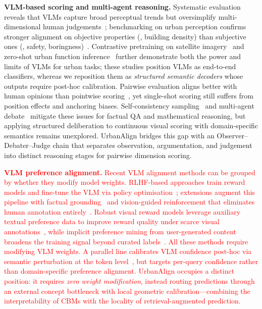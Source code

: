 \documentclass[runningheads]{llncs}
\begin{document}
\smallskip\noindent\textbf{VLM-based scoring and multi-agent reasoning.}
Systematic evaluation reveals that VLMs capture broad perceptual trends but oversimplify multi-dimensional human judgements~\cite{zhang2025genai}; benchmarking on urban perception confirms stronger alignment on objective properties (\eg, building density) than subjective ones (\eg, safety, boringness)~\cite{mushkani2025dovlms}.
Contrastive pretraining on satellite imagery~\cite{yan2024urbanclip} and zero-shot urban function inference~\cite{huang2024zeroshot} further demonstrate both the power and limits of VLMs for urban tasks; these studies position VLMs as end-to-end classifiers, whereas we reposition them as \emph{structured semantic decoders} whose outputs require post-hoc calibration.
Pairwise evaluation aligns better with human opinions than pointwise scoring~\cite{wu2024qalign,liu2024pairs}, yet single-shot scoring still suffers from position effects and anchoring biases.
Self-consistency sampling~\cite{wang2023selfconsistency} and multi-agent debate~\cite{du2024improving,liang2024encouraging,liu2025dmad} mitigate these issues for factual QA and mathematical reasoning, but applying structured deliberation to continuous visual scoring with domain-specific semantics remains unexplored.
UrbanAlign bridges this gap with an Observer--Debater--Judge chain that separates observation, argumentation, and judgement into distinct reasoning stages for pairwise dimension scoring.

\smallskip\noindent\textbf{\textcolor{red}{VLM preference alignment.}}
\textcolor{red}{Recent VLM alignment methods can be grouped by whether they modify model weights.
RLHF-based approaches train reward models and fine-tune the VLM via policy optimisation~\cite{ouyang2022training}; extensions augment this pipeline with factual grounding~\cite{sun2023factually} and vision-guided reinforcement that eliminates human annotation entirely~\cite{zhan2025visionr1}.
Robust visual reward models leverage auxiliary textual preference data to improve reward quality under scarce visual annotations~\cite{wang2024rovrm}, while implicit preference mining from user-generated content broadens the training signal beyond curated labels~\cite{tan2025implicit}.
All these methods require modifying VLM weights.
A parallel line calibrates VLM confidence post-hoc via semantic perturbation at the token level~\cite{zhao2025calibration}, but targets per-query confidence rather than domain-specific preference alignment.
UrbanAlign occupies a distinct position: it requires \emph{zero weight modification}, instead routing predictions through an external concept bottleneck with local geometric calibration---combining the interpretability of CBMs with the locality of retrieval-augmented prediction.}
\end{document}
